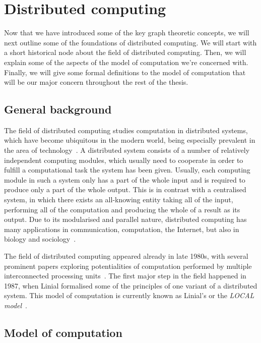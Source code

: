 \section{Distributed computing}

Now that we have introduced some of the key graph theoretic concepts, we will
next outline some of the foundations of distributed computing. We will start with
a short historical node about the field of distributed computing. Then, we will
explain some of the aspects of the model of computation we're concerned with. Finally, 
we will give some formal definitions to the model of computation that will be our
major concern throughout the rest of the thesis.

\subsection{General background}

The field of distributed computing studies computation in distributed systems, which
have become ubiquitous in the modern world, being especially prevalent
in the area of technology~\cite{Attiya2004}.
A distributed system consists of a number of relatively independent
computing modules, which usually need to cooperate in order to
fulfill a computational task the system has been given. Usually,
each computing module in such a system only has a part of the whole
input and is required to produce only a part of the whole output.
This is in contrast with a centralised system, in which there 
exists an all-knowing entity taking all of the input, performing all
of the computation and producing the whole of a result as its output.
Due to its modularised and parallel nature, distributed computing
has many applications in communication, computation, the Internet,
but also in biology and sociology~\cite{Wattenhofer2016}.

The field of distributed computing appeared already in late 1980s, with several
prominent papers exploring potentialities of computation performed
by multiple interconnected processing units~\cite{Cole1986, Linial1987, Naor1991}.
The first major step in the field happened in 1987, when Linial formalised
some of the principles of one variant of a distributed system.
This model of computation is currently known as Linial's or the \emph{LOCAL model}~\cite{Linial1987}.

\subsection{Model of computation}

